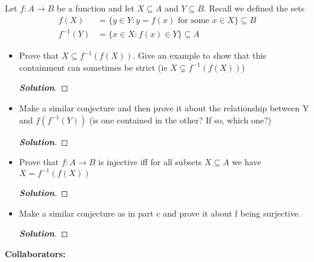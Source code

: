 \documentclass[11pt]{article}
\newenvironment{problem}[2][Problem\!]{\begin{trivlist}
\item[\hskip \labelsep {\bfseries #1}\hskip \labelsep {\bfseries #2.}]}{\end{trivlist}}
\newenvironment{solution}{\begin{proof}[\textbf{\textit{Solution}}]}{\end{proof}}
\begin{document}
\newpage %

\begin{problem}{8.3}
 Let \(f: A \to B\) be a function and let \(X \subseteq A\) and \(Y \subseteq B\). Recall we defined the sets \begin{align*}
        f(X) & = \{ y \in Y : y=f(x) \text{ for some } x \in X\} \subseteq B\\
        f^{-1}(Y) & = \{x \in X : f(x) \in Y \} \subseteq A
\end{align*}
\begin{itemize}[itemsep=3em]
    \item[(a)] Prove that \(X \subseteq f^{-1}(f(X)) \). Give an example to show that this containment can sometimes be strict (ie \( X \subsetneq f^{-1}(f(X))\))
    \begin{solution}
    \end{solution}
    \item [(b)] Make a similar conjecture and then prove it about the relationship between Y and \(f(f^{-1}(Y))\) (is one contained in the other? If so, which one?)
    \begin{solution}
    \end{solution}
    \item [(c)] Prove that \(f: A \to B\) is injective iff for all subsets \(X \subseteq A\) we have \(X = f^{-1}(f(X)) \)
    \begin{solution}
    \end{solution}
    \item [(d)] Make a similar conjecture as in part c and prove it about f being surjective.
    \begin{solution}
    \end{solution}

\end{itemize}
\end{problem}

\newpage  %



\begin{center}
\textbf{Collaborators:}
\end{center}
\vfill 
\end{document}
